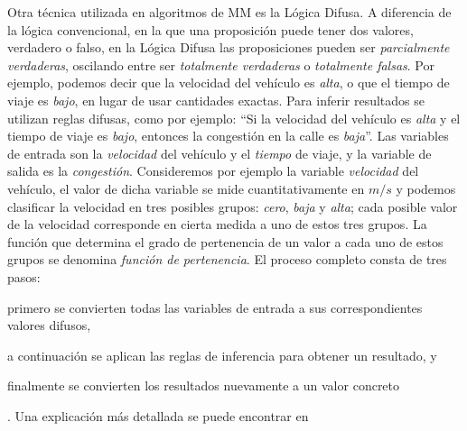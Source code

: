 Otra técnica utilizada en algoritmos de MM es la Lógica Difusa. A diferencia de la lógica convencional, en la que una proposición puede tener dos valores, verdadero o falso, en la Lógica Difusa las proposiciones pueden ser \emph{parcialmente verdaderas}, oscilando entre ser \emph{totalmente verdaderas} o \emph{totalmente falsas}. Por ejemplo, podemos decir que la velocidad del vehículo es \emph{alta}, o que el tiempo de viaje es \emph{bajo}, en lugar de usar cantidades exactas. Para inferir resultados se utilizan reglas difusas, como por ejemplo: “Si la velocidad del vehículo es \emph{alta} y el tiempo de viaje es \emph{bajo}, entonces la congestión en la calle es \emph{baja}”. Las variables de entrada son la \emph{velocidad} del vehículo y el \emph{tiempo} de viaje, y la variable de salida es la \emph{congestión}. Consideremos por ejemplo la variable \emph{velocidad} del vehículo, el valor de dicha variable se mide cuantitativamente en $m/s$ y podemos clasificar la velocidad en tres posibles grupos: \emph{cero}, \emph{baja} y \emph{alta}; cada posible valor de la velocidad corresponde en cierta medida a uno de estos tres grupos. La función que determina el grado de pertenencia de un valor a cada uno de estos grupos se denomina \emph{función de pertenencia}. El proceso completo consta de tres pasos: \begin{enumerate*}[1)]
\item primero se convierten todas las variables de entrada a sus correspondientes valores difusos, 
\item a continuación se aplican las reglas de inferencia para obtener un resultado, y
\item finalmente se convierten los resultados nuevamente a un valor concreto
\end{enumerate*}. Una explicación más detallada se puede encontrar en \citep{zadeh1988fuzzy}

